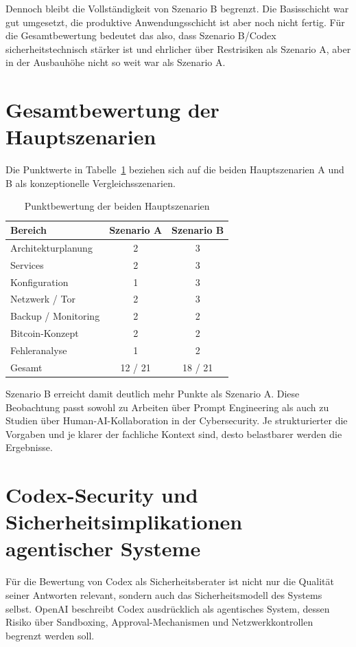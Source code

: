 Dennoch bleibt die Vollständigkeit von Szenario B begrenzt. Die Basisschicht war gut umgesetzt, die produktive Anwendungsschicht ist aber noch nicht fertig. Für die Gesamtbewertung bedeutet das  also, dass Szenario B/Codex sicherheitstechnisch stärker ist und ehrlicher über Restrisiken als Szenario A, aber in der Ausbauhöhe nicht so weit war als Szenario A. 

\section{Gesamtbewertung der Hauptszenarien}

Die Punktwerte in Tabelle~\ref{tab:ki-sicherheitsberater-bewertung} beziehen sich auf die beiden Hauptszenarien A und B als konzeptionelle Vergleichsszenarien. 

\begin{table}[h]
\centering
\begin{tabular}{lcc}
\hline
Bereich & Szenario A & Szenario B \\
\hline
Architekturplanung & 2 & 3 \\
Services & 2 & 3 \\
Konfiguration & 1 & 3 \\
Netzwerk / Tor & 2 & 3 \\
Backup / Monitoring & 2 & 2 \\
Bitcoin-Konzept & 2 & 2 \\
Fehleranalyse & 1 & 2 \\
\hline
Gesamt & 12 / 21 & 18 / 21 \\
\hline
\end{tabular}
\caption{Punktbewertung der beiden Hauptszenarien}
\label{tab:ki-sicherheitsberater-bewertung}
\end{table}

Szenario B erreicht damit deutlich mehr Punkte als Szenario A. Diese Beobachtung passt sowohl zu Arbeiten über Prompt Engineering als auch zu Studien über Human-AI-Kollaboration in der Cybersecurity. Je strukturierter die Vorgaben und je klarer der fachliche Kontext sind, desto belastbarer werden die Ergebnisse.\cite{chen2023promptreview,tariq2025bridgingexpertise}


\section{Codex-Security und Sicherheitsimplikationen agentischer Systeme}

Für die Bewertung von Codex als Sicherheitsberater ist nicht nur die Qualität seiner Antworten relevant, sondern auch das Sicherheitsmodell des Systems selbst. OpenAI beschreibt Codex ausdrücklich als agentisches System, dessen Risiko über Sandboxing, Approval-Mechanismen und Netzwerkkontrollen begrenzt werden soll.\cite{openai2026codexsandbox,openai2026codexapprovals} 

